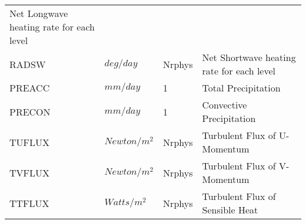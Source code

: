 \begin{tabular}{llll}
\begin{minipage}[t]{3in}
      {Net Longwave heating rate for each level}
     \end{minipage}\\
 RADSW    &  $deg/day$ &  Nrphys 
     &\begin{minipage}[t]{3in}
      {Net Shortwave heating rate for each level}
     \end{minipage}\\
 PREACC   &  $mm/day$ &  1
     &\begin{minipage}[t]{3in}
      {Total Precipitation}
     \end{minipage}\\
 PRECON   &  $mm/day$ &  1
     &\begin{minipage}[t]{3in}
      {Convective Precipitation}
     \end{minipage}\\
 TUFLUX   &  $Newton/m^2$ &  Nrphys
     &\begin{minipage}[t]{3in}
      {Turbulent Flux of U-Momentum}
     \end{minipage}\\
 TVFLUX   &  $Newton/m^2$ &  Nrphys
     &\begin{minipage}[t]{3in}
      {Turbulent Flux of V-Momentum}
     \end{minipage}\\
 TTFLUX   &  $Watts/m^2$ &  Nrphys
     &\begin{minipage}[t]{3in}
      {Turbulent Flux of Sensible Heat}
     \end{minipage}\\
\end{tabular}

